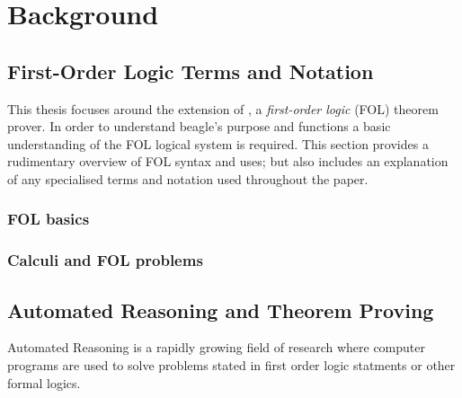 
\chapter{Background}
\label{cha:background}

\section{First-Order Logic Terms and Notation}
\label{sec:senfol}

This thesis focuses around the extension of \beagle, a \emph{first-order logic} (FOL) theorem prover.
In order to understand beagle's purpose and functions a basic understanding of the FOL logical system
is required. This section provides a rudimentary overview of FOL syntax and uses;
but also includes an explanation of any specialised terms and notation used throughout the paper.

\subsection{FOL basics}


\subsection{Calculi and FOL problems}


\section{Automated Reasoning and Theorem Proving}
\label{sec:proving}

Automated Reasoning is a rapidly growing field of research where computer programs
are used to solve problems stated in first order logic statments or other formal logics.

